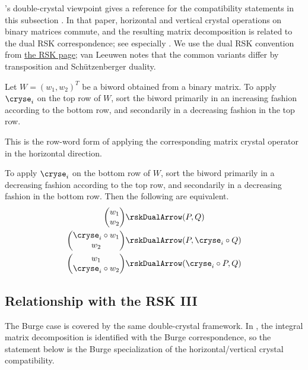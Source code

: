 's double-crystal
viewpoint gives a reference for the compatibility statements in this
subsection \cite{VanLeeuwen2006}.  In that paper, horizontal and vertical
crystal operations on binary matrices commute, and the resulting matrix
decomposition is related to the dual RSK correspondence; see especially
\cite[Prop.~3.3.4]{VanLeeuwen2006}.  We use the dual RSK convention from
\hyperref[rskDual]{the RSK page}; van Leeuwen notes that the common variants
differ by transposition and Schützenberger duality.

\bigskip

Let $W = (w_1,w_2)^T$ be a biword obtained from a binary matrix.
To apply $\cryse_i$ on the top row of $W$, sort the biword primarily in an increasing fashion
according to the bottom row, and secondarily in a decreasing fashion in the top row.

This is the row-word form of applying the corresponding matrix crystal
operator in the horizontal direction.

To apply $\cryse_i$ on the bottom row of $W$, sort the biword primarily in a decreasing fashion
according to the top row, and secondarily in a decreasing fashion in the bottom row.
Then the following are equivalent.
\begin{align}
\begin{pmatrix} w_1 \\ w_2 \end{pmatrix} & \rskDualArrow (P,Q)  \\
\begin{pmatrix} \cryse_i \circ w_1 \\ w_2 \end{pmatrix} & \rskDualArrow (P, \cryse_i \circ Q) \\
\begin{pmatrix}  w_1 \\ \cryse_i \circ w_2 \end{pmatrix} & \rskDualArrow (\cryse_i \circ P, Q)
\end{align}



\subsection[crystalsAndRSKIII]{Relationship with the RSK III}

The Burge case is covered by the same double-crystal framework.  In
\cite[Prop.~3.3.2]{VanLeeuwen2006}, the integral matrix decomposition is
identified with the Burge correspondence, so the statement below is the
Burge specialization of the horizontal/vertical crystal compatibility.


